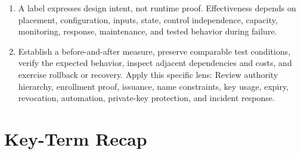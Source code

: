 \documentclass[11pt]{article}
\begin{document}
\begin{enumerate}
\item A label expresses design intent, not runtime proof. Effectiveness depends on placement, configuration, inputs, state, control independence, capacity, monitoring, response, maintenance, and tested behavior during failure.
\item Establish a before-and-after measure, preserve comparable test conditions, verify the expected behavior, inspect adjacent dependencies and costs, and exercise rollback or recovery. Apply this specific lens: Review authority hierarchy, enrollment proof, issuance, name constraints, key usage, expiry, revocation, automation, private-key protection, and incident response.
\end{enumerate}
\section{Key-Term Recap}
\end{document}
